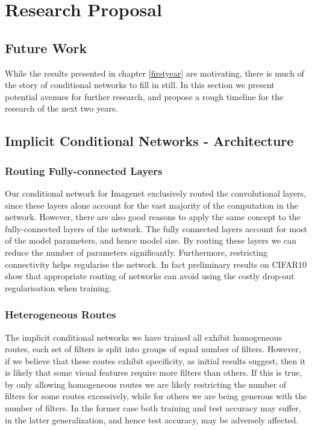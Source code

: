\documentclass[thesis]{subfiles}
\begin{document}
\chapter{Research Proposal}
\label{futurework}
\section{Future Work}
While the results presented in chapter \ref{firstyear} are motivating, there is much of the story of conditional networks to fill in still. In this section we present potential avenues for further research, and propose a rough timeline for the research of the next two years.
\section{Implicit Conditional Networks - Architecture}
\subsection{Routing Fully-connected Layers}
Our conditional network for Imagenet exclusively routed the convolutional layers, since these layers alone account for the vast majority of the computation in the network. However, there are also good reasons to apply the same concept to the fully-connected layers of the network. The fully connected layers account for most of the model parameters, and hence model size. By routing these layers we can reduce the number of parameters significantly. Furthermore, restricting connectivity helps regularise the network. In fact preliminary results on CIFAR10 show that appropriate routing of networks can avoid using the costly drop-out regularisation when training.
\subsection{Heterogeneous Routes}
The implicit conditional networks we have trained all exhibit homogeneous routes, \ie each set of filters is split into groups of equal number of filters. However, if we believe that these routes exhibit specificity, as initial results suggest, then it is likely that some visual features require more filters than others. If this is true, by only allowing homogeneous routes we are likely restricting the number of filters for some routes excessively, while for others we are being generous with the number of filters. In the former case both training and test accuracy may suffer, in the latter generalization, and hence test accuracy, may be adversely affected.
\end{document}
